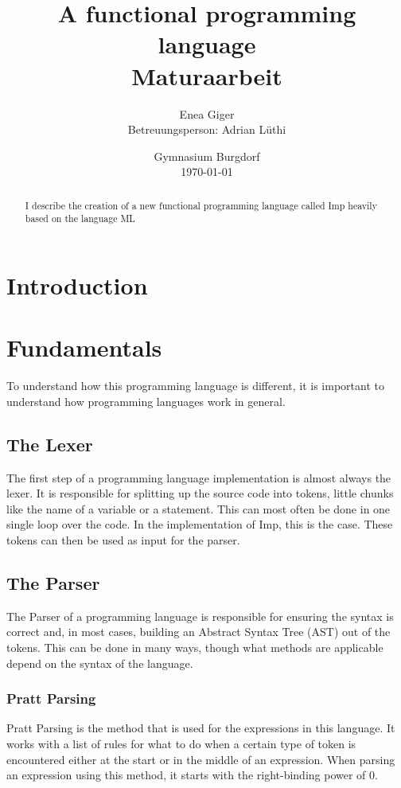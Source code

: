 \documentclass[12pt]{article}
\title{A functional programming language\\Maturaarbeit}
\author{Enea Giger\\Betreuungsperson: Adrian Lüthi}
\date{Gymnasium Burgdorf\\\today}
\begin{document}
\maketitle
\newpage

\begin{abstract}
      I describe the creation of a new functional programming language called Imp
      heavily based on the language ML
\end{abstract}

\tableofcontents
\newpage


\section{Introduction}

\section{Fundamentals}
To understand how this programming language is different, it is important to understand how programming languages work in general.

\subsection{The Lexer}
The first step of a programming language implementation is almost always the lexer.
It is responsible for splitting up the source code into tokens, little chunks like the name of a variable or a statement.
This can most often be done in one single loop over the code.
In the implementation of Imp, this is the case.
These tokens can then be used as input for the parser.

\subsection{The Parser}
The Parser of a programming language is responsible for ensuring the syntax is correct and, in most cases,
building an Abstract Syntax Tree (AST) out of the tokens.
This can be done in many ways, though what methods are applicable
depend on the syntax of the language.
\subsubsection{Pratt Parsing}
Pratt Parsing \cite{prattTopOperatorPrecedence1973}
is the method that is used for the expressions in this language.
It works with a list of rules for what to do when a certain type of token is encountered
either at the start or in the middle of an expression.
When parsing an expression using this method,
it starts with the right-binding power of 0.
\end{document}
